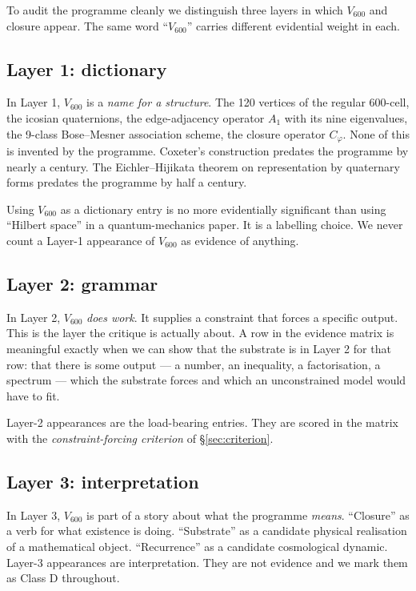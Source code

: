 \documentclass[11pt,a4paper]{article}
\newcommand{\Vsix}{V_{600}}
\newcommand{\Cphi}{C_\varphi}
\begin{document}
To audit the programme cleanly we distinguish three layers in which
$\Vsix$ and closure appear. The same word ``$\Vsix$'' carries
different evidential weight in each.

\subsection{Layer 1: dictionary}

In Layer 1, $\Vsix$ is a \emph{name for a structure}. The 120
vertices of the regular $600$-cell, the icosian quaternions, the
edge-adjacency operator $A_1$ with its nine eigenvalues, the
9-class Bose--Mesner association scheme, the closure operator
$\Cphi$. None of this is invented by the programme. Coxeter's
construction predates the programme by nearly a century. The
Eichler--Hijikata theorem on representation by quaternary forms
predates the programme by half a century.

Using $\Vsix$ as a dictionary entry is no more evidentially
significant than using ``Hilbert space'' in a quantum-mechanics
paper. It is a labelling choice. We never count a Layer-1
appearance of $\Vsix$ as evidence of anything.

\subsection{Layer 2: grammar}

In Layer 2, $\Vsix$ \emph{does work}. It supplies a constraint that
forces a specific output. This is the layer the critique is
actually about. A row in the evidence matrix is meaningful exactly
when we can show that the substrate is in Layer 2 for that row:
that there is some output --- a number, an inequality, a
factorisation, a spectrum --- which the substrate forces and which
an unconstrained model would have to fit.

Layer-2 appearances are the load-bearing entries. They are scored
in the matrix with the \emph{constraint-forcing criterion} of
\S\ref{sec:criterion}.

\subsection{Layer 3: interpretation}

In Layer 3, $\Vsix$ is part of a story about what the programme
\emph{means}. ``Closure'' as a verb for what existence is doing.
``Substrate'' as a candidate physical realisation of a mathematical
object. ``Recurrence'' as a candidate cosmological dynamic.
Layer-3 appearances are interpretation. They are not evidence and
we mark them as Class D throughout.
\end{document}
